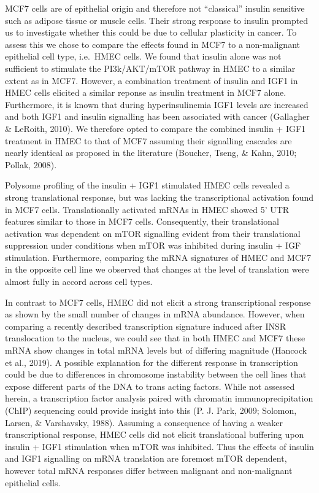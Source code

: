 \documentclass[12pt,openany]{book}
\begin{document}
MCF7 cells are of epithelial origin and therefore not ``classical''
insulin sensitive such as adipose tissue or muscle cells. Their strong
response to insulin prompted us to investigate whether this could be due
to cellular plasticity in cancer. To assess this we chose to compare the
effects found in MCF7 to a non-malignant epithelial cell type, i.e.~HMEC
cells. We found that insulin alone was not sufficient to stimulate the
PI3k/AKT/mTOR pathway in HMEC to a similar extent as in MCF7. However, a
combination treatment of insulin and IGF1 in HMEC cells elicited a
similar reponse as insulin treatment in MCF7 alone. Furthermore, it is
known that during hyperinsulinemia IGF1 levels are increased and both
IGF1 and insulin signalling has been associated with cancer (Gallagher
\& LeRoith, 2010). We therefore opted to compare the combined insulin +
IGF1 treatment in HMEC to that of MCF7 assuming their signalling
cascades are nearly identical as proposed in the literature (Boucher,
Tseng, \& Kahn, 2010; Pollak, 2008).

Polysome profiling of the insulin + IGF1 stimulated HMEC cells revealed
a strong translational response, but was lacking the transcriptional
activation found in MCF7 cells. Translationally activated mRNAs in HMEC
showed 5' UTR features similar to those in MCF7 cells. Consequently,
their translational activation was dependent on mTOR signalling evident
from their translational suppression under conditions when mTOR was
inhibited during insulin + IGF stimulation. Furthermore, comparing the
mRNA signatures of HMEC and MCF7 in the opposite cell line we observed
that changes at the level of translation were almost fully in accord
across cell types.

In contrast to MCF7 cells, HMEC did not elicit a strong transcriptional
response as shown by the small number of changes in mRNA abundance.
However, when comparing a recently described transcription signature
induced after INSR translocation to the nucleus, we could see that in
both HMEC and MCF7 these mRNA show changes in total mRNA levels but of
differing magnitude (Hancock et al., 2019). A possible explanation for
the different response in transcription could be due to differences in
chromosome instability between the cell lines that expose different
parts of the DNA to trans acting factors. While not assessed herein, a
transcription factor analysis paired with chromatin immunoprecipitation
(ChIP) sequencing could provide insight into this (P. J. Park, 2009;
Solomon, Larsen, \& Varshavsky, 1988). Assuming a consequence of having
a weaker transcriptional response, HMEC cells did not elicit
translational buffering upon insulin + IGF1 stimulation when mTOR was
inhibited. Thus the effects of insulin and IGF1 signalling on mRNA
translation are foremost mTOR dependent, however total mRNA responses
differ between malignant and non-malignant epithelial cells.
\end{document}
